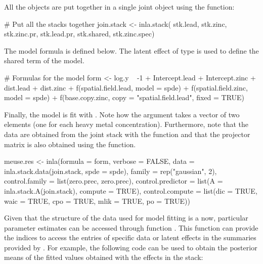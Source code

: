 All the  objects are put together in a single joint  object using the  function: 

\begin{example*}
# Put all the stacks together
join.stack <- inla.stack(
  stk.lead, stk.zinc, 
  stk.zinc.pr, stk.lead.pr,
  stk.shared, stk.zinc.spec)
\end{example*}

The model formula is defined below. The latent effect of type  is used to define the shared term of the model. 

\begin{example*}
# Formulas for the model
form <- log.y ~ -1 + Intercept.lead + Intercept.zinc + dist.lead + dist.zinc + 
  f(spatial.field.lead, model = spde) +
  f(spatial.field.zinc, model = spde) + 
  f(base.copy.zinc, copy = "spatial.field.lead", fixed = TRUE)  

\end{example*}

Finally, the model is fit with . Note how the  argument takes a vector of two  elements (one for each heavy metal concentration). Furthermore, note that the data are obtained from the joint stack with the  function and that the projector matrix  is also obtained using the  function. 

\begin{example*}
meuse.res <- inla(formula = form, verbose = FALSE, 
  data = inla.stack.data(join.stack, spde = spde),
  family = rep("gaussian", 2), 
  control.family = list(zero.prec, zero.prec),
  control.predictor = list(A = inla.stack.A(join.stack), compute = TRUE),
  control.compute = list(dic = TRUE, waic = TRUE, cpo = TRUE, mlik = TRUE, po = TRUE))
\end{example*}

Given that the structure of the data used for model fitting is a  now, particular parameter estimates can be accessed through function . This function can provide the indices to access the entries of
specific data or latent effects in the summaries provided by . For example, the following code can be used to obtain the posterior means of the fitted values obtained with the effects in the  stack:



